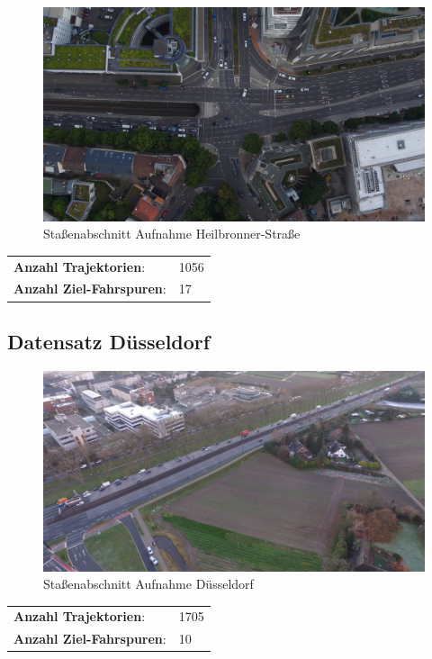 \begin{minipage}{0.55\textwidth}
    \begin{figure}[H]
        \includegraphics[width=\linewidth]{resources/img/Anhang/Heilbronner}
    \caption[]{Staßenabschnitt Aufnahme Heilbronner-Straße}
    \label{fig:anhang_ds_heilbronner}
    \end{figure}
\end{minipage} \hfill
\begin{minipage}{0.35\textwidth}
    \begin{tabular}{ll}
    \textbf{Anzahl Trajektorien}: &  1056 \\
    \textbf{Anzahl Ziel-Fahrspuren}: & 17 \\
    \end{tabular}
\end{minipage}

\subsection*{Datensatz Düsseldorf}

\begin{minipage}{0.55\textwidth}
    \begin{figure}[H]
        \includegraphics[width=\linewidth]{resources/img/Anhang/Duesseldorf}
    \caption[]{Staßenabschnitt Aufnahme Düsseldorf}
    \label{fig:anhang_ds_duesseldorf}
    \end{figure}
\end{minipage} \hfill
\begin{minipage}{0.35\textwidth}
    \begin{tabular}{ll}
    \textbf{Anzahl Trajektorien}: & 1705 \\
    \textbf{Anzahl Ziel-Fahrspuren}: & 10 \\
    \end{tabular}
\end{minipage}

